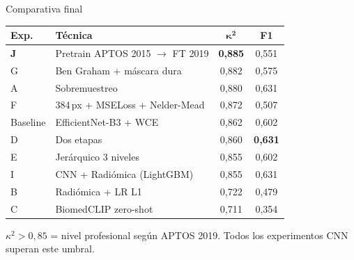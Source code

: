 \documentclass[aspectratio=169, 11pt]{beamer}
\begin{document}
\begin{frame}{Comparativa final}

  \centering
  \small
  \begin{tabular}{llcc}
    \toprule
    \rowcolor{azuloscuro!15}
    \textbf{Exp.} & \textbf{Técnica} & $\boldsymbol{\kappa^2}$ & \textbf{F1} \\
    \midrule
    \textbf{J} & Pretrain APTOS 2015 $\to$ FT 2019 & \textbf{0,885} & 0,551 \\
    G & Ben Graham + máscara dura       & 0,882 & 0,575 \\
    A & Sobremuestreo                   & 0,880 & 0,631 \\
    F & 384\,px + MSELoss + Nelder-Mead & 0,872 & 0,507 \\
    \rowcolor{azulmedio!10}
    Baseline & EfficientNet-B3 + WCE    & 0,862 & 0,602 \\
    D & Dos etapas                      & 0,860 & \textbf{0,631} \\
    E & Jerárquico 3 niveles            & 0,855 & 0,602 \\
    I & CNN + Radiómica (LightGBM)      & 0,855 & 0,631 \\
    B & Radiómica + LR L1               & 0,722 & 0,479 \\
    C & BiomedCLIP zero-shot            & 0,711 & 0,354 \\
    \bottomrule
  \end{tabular}

  \vspace{6pt}
  {\footnotesize $\kappa^2 > 0{,}85$ = nivel profesional según APTOS 2019.
   Todos los experimentos CNN superan este umbral.}
\end{frame}
\end{document}
